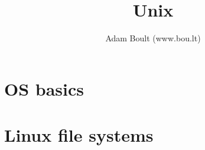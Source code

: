 \documentclass[oneside]{book}
\begin{document}
\author{Adam Boult (www.bou.lt)}
\title{Unix}
\maketitle

\setcounter{tocdepth}{0}
\tableofcontents





\part{OS basics}









\part{Linux file systems}














\end{document}

